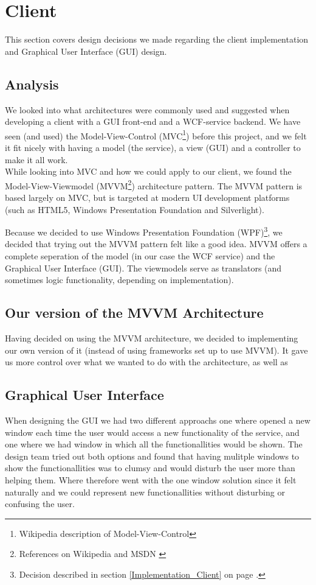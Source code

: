 \section{Client}
\label{Design_Client}
This section covers design decisions we made regarding the client implementation and Graphical User Interface (GUI) design.
\subsection{Analysis}
\label{Design_Client_Analysis}
We looked into what architectures were commonly used and suggested when developing a client with a GUI front-end and a WCF-service backend. We have seen (and used) the Model-View-Control (MVC\footnote{Wikipedia description of Model-View-Control\cite{WIKI-MVC}}) before this project, and we felt it fit nicely with having a model (the service), a view (GUI) and a controller to make it all work. 
\\While looking into MVC and how we could apply to our client, we found the Model-View-Viewmodel (MVVM\footnote{References on Wikipedia \cite{WIKI-MVVM} and MSDN \cite{MSDN-WPF-MVVM}}) architecture pattern. The MVVM pattern is based largely on MVC, but is targeted at modern UI development platforms (such as HTML5, Windows Presentation Foundation and Silverlight).

Because we decided to use Windows Presentation Foundation (WPF)\footnote{Decision described in section \ref{Implementation_Client} on page \pageref{Implementation_Client}.}, we decided that trying out the MVVM pattern felt like a good idea. MVVM offers a complete seperation of the model (in our case the WCF service) and the Graphical User Interface (GUI). The viewmodels serve as translators (and sometimes logic functionality, depending on implementation).
\subsection[Architecture]{Our version of the MVVM Architecture}
\label{Design_Client_Architecture}
Having decided on using the MVVM architecture, we decided to implementing our own version of it (instead of using frameworks set up to use MVVM). It gave us more control over what we wanted to do with the architecture, as well as 
\subsection{Graphical User Interface}
\label{Design_Client_GUI}
When designing the GUI we had two different approachs one where opened a new window each time the user would access a new functionality of the service, and one where we had window in which all the functionallities would be shown. The design team tried out both options and found that having mulitple windows to show the functionallities was to clumsy and would disturb the user more than helping them. Where therefore went with the one window solution since it felt naturally and we could represent new functionallities without disturbing or confusing the user.

